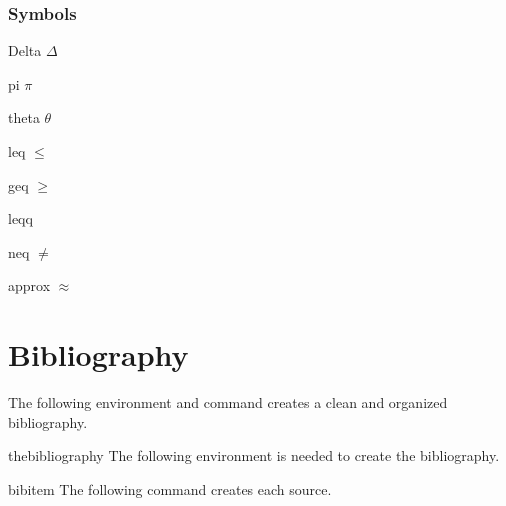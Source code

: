 	\subsubsection{Symbols}
		\begin{docCommand}{Delta}{}
			$\Delta$
		\end{docCommand}
		\begin{docCommand}{pi}{}
			$\pi$
		\end{docCommand}	
		\begin{docCommand}{theta}{}
			$\theta$
		\end{docCommand}
		\begin{docCommand}{leq}{}
			$\leq$
		\end{docCommand}
		\begin{docCommand}{geq}{}
			$\geq$
		\end{docCommand}
		\begin{docCommand}{leqq}{}
			
		\end{docCommand}	
		\begin{docCommand}{neq}{}
			$\neq$
		\end{docCommand}
		\begin{docCommand}{approx}{}
			$\approx$
		\end{docCommand}
\newpage
\section{Bibliography}
\vspace{10.5cm}
The following environment and command creates a clean and organized bibliography.
	\begin{docEnvironment}{thebibliography}{}
			The following environment is needed to create the bibliography.
	\end{docEnvironment}
	\begin{docCommand}{bibitem}{}
			The following command creates each source.
	\end{docCommand}
